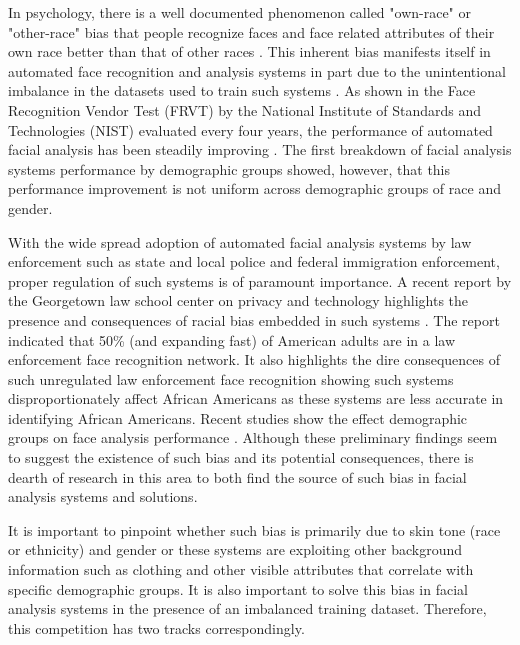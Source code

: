 \documentclass[11pt, oneside]{article}
\makeatletter
\let\@internalcite\cite
\def\cite{\def\citeauthoryear##1##2{##1, ##2}\@internalcite}
\makeatother
\begin{document}
In psychology, there is a well documented phenomenon called "own-race" or 
"other-race" bias that people recognize faces and face related attributes of 
their own race better than that of other races \cite{furl2002face}. This 
inherent bias manifests itself in automated face recognition and analysis 
systems in part due to the unintentional imbalance in the datasets used to 
train such systems \cite{phillips2011other}. As shown in the Face Recognition 
Vendor Test (FRVT) by the National Institute of Standards and Technologies 
(NIST) evaluated every four years, the performance of automated facial analysis 
has been steadily improving \cite{grother2010report}. The first breakdown of 
facial analysis systems performance by demographic groups 
\cite{phillips2011other} showed, however, that this performance improvement is 
not uniform across demographic groups of race and gender.

With the wide spread adoption of automated facial analysis systems by law 
enforcement such as state and local police and federal immigration enforcement, 
proper regulation of such systems is of paramount importance. A recent report 
by the Georgetown law school center on privacy and technology highlights the 
presence and consequences of racial bias embedded in such systems 
\cite{garvie2016perpetual}. The report indicated that 50\% (and expanding fast) 
of American adults are in a law enforcement face recognition network. It also 
highlights the dire consequences of such unregulated law enforcement face 
recognition showing such systems disproportionately affect African Americans as 
these systems are less accurate in identifying African Americans. Recent 
studies show the effect demographic groups on face analysis performance 
\cite{han2015demographic} \cite{farinella2012demographic} \cite{klare2012face}. 
Although these preliminary findings seem to suggest the existence of such bias 
and its potential consequences, there is dearth of research in this area to 
both find the source of such bias in facial analysis systems and solutions.

It is important to pinpoint whether such bias is primarily due to skin tone 
(race or ethnicity) and gender or these systems are exploiting other background 
information such as clothing and other visible attributes that correlate with 
specific demographic groups. It is also important to solve this bias in facial 
analysis systems in the presence of an imbalanced training dataset. Therefore, 
this competition has two tracks correspondingly.
\end{document}
